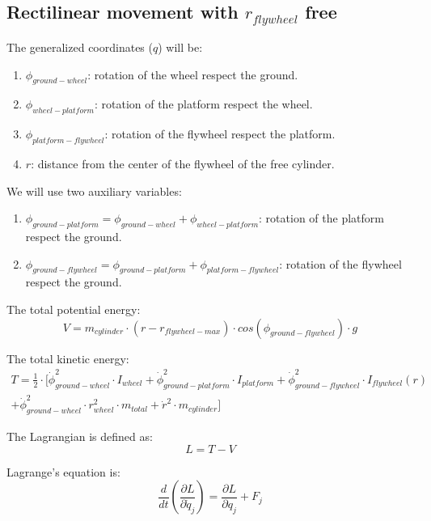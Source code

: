 


\subsection{Rectilinear movement with $r_{flywheel}$ free}

The generalized coordinates ($q$) will be:
\begin{enumerate}
	\item $\phi_{ground-wheel}$: rotation of the wheel respect the ground.
	\item $\phi_{wheel-platform}$: rotation of the platform respect the wheel.
	\item $\phi_{platform-flywheel}$: rotation of the flywheel respect the platform.
	\item $r$: distance from the center of the flywheel of the free cylinder.

\end{enumerate}

We will use two auxiliary variables:
\begin{enumerate}
	\item $\phi_{ground-platform}=\phi_{ground-wheel}+\phi_{wheel-platform}$: rotation of the platform respect the ground.
	\item $\phi_{ground-flywheel}=\phi_{ground-platform}+\phi_{platform-flywheel}$: rotation of the flywheel respect the ground.
\end{enumerate}

The total potential energy:
\begin{equation}
	V = m_{cylinder}\cdot (r-r_{flywheel-max}) \cdot cos(\phi_{ground-flywheel}) \cdot g
\end{equation}


The total kinetic energy:
\begin{multline}
	T = \frac{1}{2}\cdot[\dot{\phi}_{ground-wheel}^2\cdot I_{wheel}
		+ \dot{\phi}_{ground-platform}^2 \cdot I_{platform}
		+ \dot{\phi}_{ground-flywheel}^2\cdot I_{flywheel}(r)\\
		+ \dot{\phi}_{ground-wheel}^2\cdot r_{wheel}^2\cdot m_{total}
		+ \dot{r}^2\cdot m_{cylinder}]
\end{multline}

The Lagrangian is defined as:
\begin{equation}
	L=T-V
\end{equation}

Lagrange's equation is:
\begin{equation}
	\frac{d}{dt}(\frac{\partial L}{\partial \dot{q}_j})=
	\frac{\partial L}{\partial q_j}	+ F_{j}
\end{equation}

